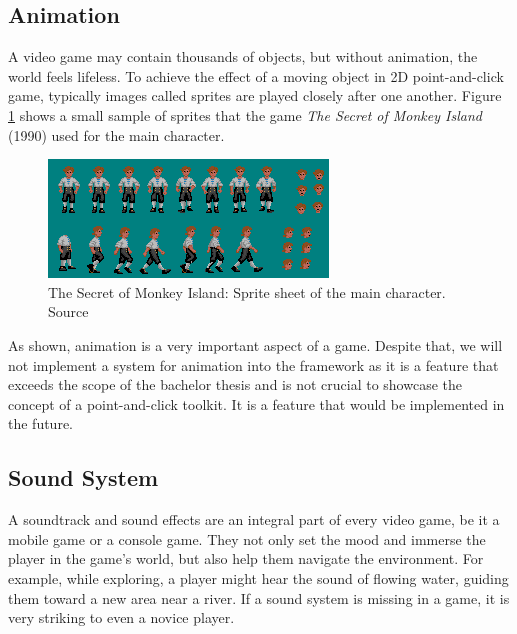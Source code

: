 \subsection{Animation}
\label{sec:Animation}
A video game may contain thousands of objects, but without animation, the world feels lifeless.  To achieve the effect of a moving object in 2D point-and-click game, typically images called sprites are played closely after one another.  Figure \ref{fig:A-TSoMI} shows a small sample of sprites that the game \textit{The Secret of Monkey Island} (1990) used for the main character.

\begin{figure}[H]
\centering
\includegraphics[width=.75\linewidth]{img/AN-TSoMI2.png}
\caption{The Secret of Monkey Island: Sprite sheet of the main character. Source \cite{TSoMI-sprites}}
\label{fig:A-TSoMI}
\end{figure}

\begin{notImplemented}
 \par
\vspace{3mm}
As shown, animation is a very important aspect of a game. Despite that, we will not implement a system for animation into the framework as it is a feature that exceeds the scope of the bachelor thesis and is not crucial to showcase the concept of a point-and-click toolkit. It is a feature that would be implemented in the future.
\end{notImplemented}

\subsection{Sound System}
\label{sec:Sound_Management}
A soundtrack and sound effects are an integral part of every video game, be it a mobile game or a console game. They not only set the mood and immerse the player in the game's world, but also help them navigate the environment. For example, while exploring, a player might hear the sound of flowing water, guiding them toward a new area near a river. If a sound system is missing in a game, it is very striking to even a novice player. 

